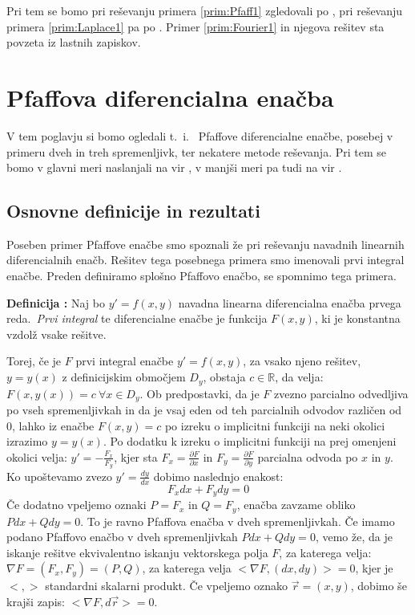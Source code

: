 \documentclass[a4paper, 10pt]{article}
\newcounter{defcount}
\newenvironment{definicija}{\begin{flushleft}\refstepcounter{defcount}\textbf{Definicija \arabic{defcount}:}}{\hfill\end{flushleft}}
\newcommand{\mth}[1]{\ensuremath{\mathbb{#1}}}
\newcommand{\R}{\mth{R}}
\newcommand{\pojem}[1]{\emph{#1}}
\begin{document}
		Pri tem se bomo pri reševanju primera \ref{prim:Pfaff1} zgledovali po \cite{bib:raman}, pri reševanju primera \ref{prim:Laplace1} pa po \cite{bib:Mag}. Primer \ref{prim:Fourier1} in njegova rešitev sta povzeta iz lastnih zapiskov.
		
	\section{Pfaffova diferencialna enačba}
		V tem poglavju si bomo ogledali t.~i.~ Pfaffove diferencialne enačbe, posebej v primeru dveh in treh spremenljivk, ter nekatere metode reševanja. Pri tem se bomo v glavni meri naslanjali na vir \cite{bib:raman}, v manjši meri pa tudi na vir \cite{bib:pfaff}.
		\subsection{Osnovne definicije in rezultati}
			Poseben primer Pfaffove enačbe smo spoznali že pri reševanju navadnih linearnih diferencialnih enačb. Rešitev tega posebnega primera smo imenovali prvi integral enačbe. Preden definiramo splošno Pfaffovo enačbo, se spomnimo tega primera.
			
			\begin{definicija}
				\label{def:1stint}
				Naj bo $y' = f(x, y)$ navadna linearna diferencialna enačba prvega reda.~\pojem{Prvi integral} te diferencialne enačbe je funkcija $F(x, y)$, ki je konstantna vzdolž vsake rešitve.
			\end{definicija}
			Torej, če je $F$ prvi integral enačbe $y' = f(x, y)$, za vsako njeno rešitev, $y = y(x)$ z definicijskim območjem $D_y$, obstaja $c\in\R$, da velja: $F(x, y(x)) = c ~\forall x\in D_y$. Ob predpostavki, da je $F$ zvezno parcialno odvedljiva po vseh spremenljivkah in da je vsaj eden od teh parcialnih odvodov različen od $0$, lahko iz enačbe $F(x, y) = c$ po izreku o implicitni funkciji na neki okolici izrazimo $y = y(x)$. Po dodatku k izreku o implicitni funkciji na prej omenjeni okolici velja: $y' = -\frac{F_x}{F_y}$, kjer sta $F_x = \frac{\partial F}{\partial x}$ in $F_y = \frac{\partial F}{\partial y}$ parcialna odvoda po $x$ in $y$. Ko upoštevamo zvezo $y' = \frac{dy}{dx}$ dobimo naslednjo enakost: $$F_x dx + F_y dy = 0$$ Če dodatno vpeljemo oznaki $P = F_x$ in $Q = F_y$, enačba zavzame obliko $P dx + Q dy = 0$. To je ravno Pfaffova enačba v dveh spremenljivkah. Če imamo podano Pfaffovo enačbo v dveh spremenljivkah $P dx + Q dy = 0$, vemo že, da je iskanje rešitve ekvivalentno iskanju vektorskega polja $F$, za katerega velja: $\nabla F = (F_x, F_y) = (P, Q)$, za katerega velja $<\nabla F, (dx, dy)> = 0$, kjer je $<, >$ standardni skalarni produkt. Če vpeljemo oznako $\vec{r} = (x, y)$, dobimo še krajši zapis: $<\nabla F, d\vec{r}> = 0$.
			
\end{document}
